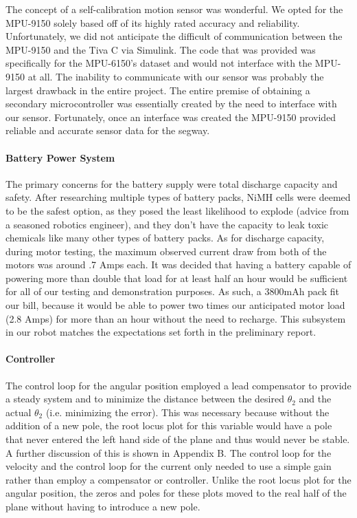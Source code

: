 \documentclass[11pt]{report}
\begin{document}
\begin{spacing}{1.5}
        The concept of a self-calibration motion sensor was wonderful.  We opted for the MPU-9150 solely based off of its highly rated accuracy and reliability.  Unfortunately, we did not anticipate the difficult of communication between the MPU-9150 and the Tiva C via Simulink.  The code that was provided was specifically for the MPU-6150's dataset and would not interface with the MPU-9150 at all.  The inability to communicate with our sensor was probably the largest drawback in the entire project.  The entire premise of obtaining a secondary microcontroller was essentially created by the need to interface with our sensor.  Fortunately, once an interface was created the MPU-9150 provided reliable and accurate sensor data for the segway.

        \paragraph{Battery Power System}
        
        The primary concerns for the battery supply were total discharge capacity and safety. After researching multiple types of battery packs, NiMH cells were deemed to be the safest option, as they posed the least likelihood to explode (advice from a seasoned robotics engineer), and they don’t have the capacity to leak toxic chemicals like many other types of battery packs. As for discharge capacity, during motor testing, the maximum observed current draw from both of the motors was around .7 Amps each. It was decided that having a battery capable of powering more than double that load for at least half an hour would be sufficient for all of our testing and demonstration purposes. As such, a 3800mAh pack fit our bill, because it would be able to power two times our anticipated motor load (2.8 Amps) for more than an hour without the need to recharge. This subsystem in our robot matches the expectations set forth in the preliminary report.
        
        \paragraph{Controller}
        
        The control loop for the angular position employed a lead compensator to provide a steady system and to minimize the distance between the desired $\theta_2$ and the actual $\theta_2$ (i.e. minimizing the error).  This was necessary because without the addition of a new pole, the root locus plot for this variable would have a pole that never entered the left hand side of the plane and thus would never be stable.  A further discussion of this is shown in Appendix B.  The control loop for the velocity and the control loop for the current only needed to use a simple gain rather than employ a compensator or controller.  Unlike the root locus plot for the angular position, the zeros and poles for these plots moved to the real half of the plane without having to introduce a new pole.  
        

\end{spacing}
\end{document}
